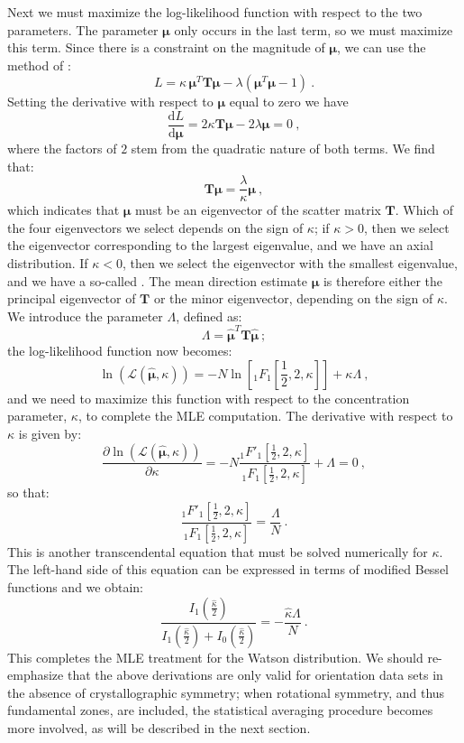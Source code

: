 Next we must maximize the log-likelihood function with respect to the two parameters.  The parameter $\bm{\mu}$ only occurs in the last term, so we must maximize this term. Since there is a constraint on the magnitude of $\bm{\mu}$, we can use the method of :
\[
	L = \kappa\,\bm{\mu}^T\mathbf{T}\bm{\mu} - \lambda(\bm{\mu}^T\bm{\mu}-1)\ .
\]
Setting the derivative with respect to $\bm{\mu}$ equal to zero we have
\[
	\frac{\mathrm{d}L}{\mathrm{d}\bm{\mu}} = 2\kappa \mathbf{T}\bm{\mu}-2\lambda \bm{\mu} = 0\ ,
\]
where the factors of $2$ stem from the quadratic nature of both terms.  We find that:
\[
	\mathbf{T}\bm{\mu} = \frac{\lambda}{\kappa}\bm{\mu}\ ,
\]
which indicates that $\bm{\mu}$ must be an eigenvector of the scatter matrix $\mathbf{T}$.  Which of the four eigenvectors we select depends on the sign of $\kappa$; if $\kappa>0$, then we select the eigenvector corresponding to the largest eigenvalue, and we have an axial distribution. If $\kappa<0$, then we select the eigenvector with the smallest eigenvalue, and we have a so-called . The mean direction estimate $\hat{\bm{\mu}}$ is therefore either the principal eigenvector of $\mathbf{T}$ or the minor eigenvector, depending on the sign of $\kappa$. We introduce the parameter $\Lambda$, defined as:
\[
	\Lambda = \hat{\bm{\mu}}^T\mathbf{T}\hat{\bm{\mu}}\ ;
\]
the log-likelihood function now becomes:
\[
	\ln(\mathcal{L}(\hat{\bm{\mu}},\kappa)) = -N\ln\left[ {_1}F_1[\frac{1}{2},2,\kappa] \right] + \kappa\Lambda\ ,
\] 
and we need to maximize this function with respect to the concentration parameter, $\kappa$, to complete the MLE computation.  The derivative with respect to $\kappa$ is given by:
\[
	\frac{\partial \ln(\mathcal{L}(\hat{\bm{\mu}},\kappa)) }{\partial\kappa} = -N\frac{ {_1}F'_1[\frac{1}{2},2,\kappa] }{ {_1}F_1[\frac{1}{2},2,\kappa] }+\Lambda = 0\ ,
\]
so that:
\[
	\frac{ {_1}F'_1[\frac{1}{2},2,\kappa] }{ {_1}F_1[\frac{1}{2},2,\kappa] } = \frac{\Lambda}{N}\ .
\]
This is another transcendental equation that must be solved numerically for $\kappa$.  The left-hand side of this equation can be expressed in terms of modified Bessel functions and we obtain:
\[
	\frac{I_1(\frac{\hat{\kappa}}{2})}{I_1(\frac{\hat{\kappa}}{2})+I_0(\frac{\hat{\kappa}}{2})} = -\frac{\hat{\kappa}\Lambda}{N}\ .
\]
This completes the MLE treatment for the Watson distribution.  We should re-emphasize that the above derivations are only valid for orientation data sets in the absence of crystallographic symmetry; when rotational symmetry, and thus fundamental zones, are included, the statistical averaging procedure becomes more involved, as will be described in the next section.



